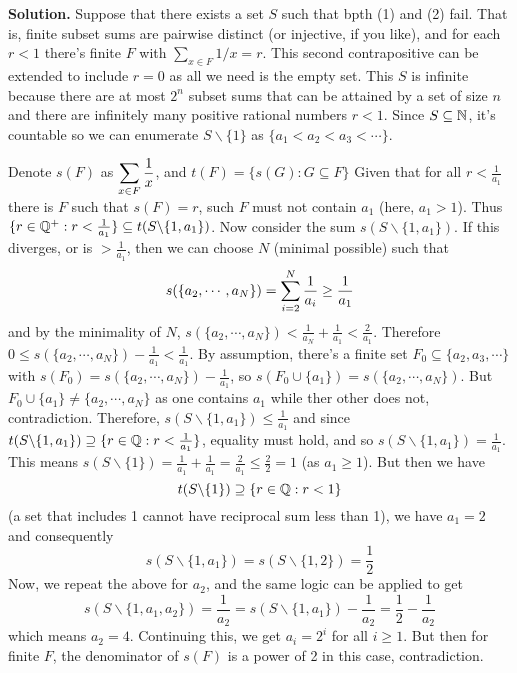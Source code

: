 \documentclass[11pt,a4paper]{article}
\begin{document}
\begin{enumerate}
	\textbf{Solution.} Suppose that there exists a set $S$ such that bpth (1) and (2) fail. That is, finite subset sums are pairwise distinct (or injective, if you like), and for each $r<1$ there's finite $F$ with $\sum_{x\in F}1/x=r$. 
	This second contrapositive can be extended to include $r=0$ as all we need is the empty set. 
	This $S$ is infinite because there are at most $2^n$ subset sums that can be attained by a set of size $n$ and there are infinitely many positive rational numbers $r<1$. Since $S\subseteq{\mathbb N}$, it's countable so we can enumerate $S\backslash\{1\}$ as $\{a_1<a_2<a_3<\cdots\}$. 
	
	Denote $s(F)$ as $\displaystyle\sum_{x\in F}\frac 1x$, and $t(F)=\{s(G): G\subseteq F\}$
	Given that for all $r<\frac{1}{a_1}$ there is $F$ such that $s(F)=r$, such $F$ must not contain $a_1$ (here, $a_1>1$). 
	Thus $\{r\in{\mathbb Q}^+: r<\frac{1}{a_1}\}\subseteq t(S\backslash\{1, a_1\})$. 
	Now consider the sum $s(S\backslash\{1, a_1\})$. If this diverges, or is $>\frac{1}{a_1}$, then we can choose $N$ (minimal possible) such that 
	\[
	s(\{a_2, \cdots , a_N\})=\displaystyle\sum_{i=2}^N \frac{1}{a_i}\ge \frac{1}{a_1}
	\]
	and by the minimality of $N$, $s(\{a_2, \cdots , a_N\})<\frac{1}{a_N}+\frac{1}{a_1}<\frac{2}{a_1}$. 
	Therefore $0\le s(\{a_2, \cdots , a_N\}) - \frac{1}{a_1}<\frac 1{a_1}$. 
	By assumption, there's a finite set $F_0\subseteq \{a_2, a_3, \cdots\}$ with $s(F_0)=s(\{a_2, \cdots , a_N\})-\frac{1}{a_1}$, so $s(F_0\cup \{a_1\})=s(\{a_2, \cdots , a_N\})$. 
	But $F_0\cup \{a_1\}\neq \{a_2, \cdots , a_N\}$ as one contains $a_1$ while ther other does not, contradiction. 
	Therefore, $s(S\backslash\{1, a_1\})\le \frac{1}{a_1}$ and since $t(S\backslash\{1, a_1\})\supseteq\{r\in{\mathbb Q}: r<\frac{1}{a_1}\}$, equality must hold, and so $s(S\backslash\{1, a_1\})= \frac{1}{a_1}$. 
	This means $s(S\backslash\{1\})= \frac{1}{a_1}+\frac{1}{a_1}=\frac{2}{a_1}\le \frac{2}{2}=1$ (as $a_1\ge 1$). 
	But then we have 
	\[
	t(S\backslash\{1\})\supseteq \{r\in{\mathbb Q}: r<1\}
	\]
	(a set that includes 1 cannot have reciprocal sum less than 1), we have $a_1=2$ and consequently 
	\[
	s(S\backslash\{1, a_1\})=s(S\backslash\{1, 2\})=\frac 12
	\]
	Now, we repeat the above for $a_2$, and the same logic can be applied to get 
	\[
	s(S\backslash\{1, a_1, a_2\})=\frac{1}{a_2}=s(S\backslash\{1, a_1\})-\frac{1}{a_2}=\frac 12-\frac{1}{a_2}
	\]
	which means $a_2=4$. Continuing this, we get $a_i=2^i$ for all $i\ge 1$. 
	But then for finite $F$, the denominator of $s(F)$ is a power of 2 in this case, contradiction. 
\end{enumerate}
\end{document}
